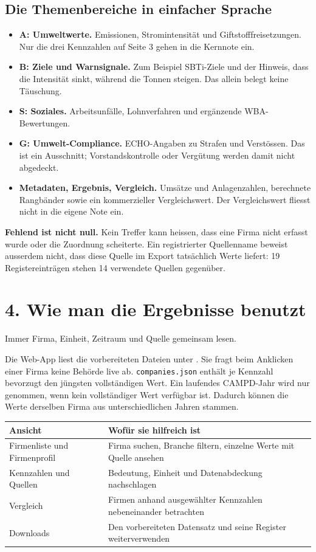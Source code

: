 \documentclass[11pt,a4paper]{article}
\newcommand{\pf}[1]{\path{#1}}
\newcommand{\lead}[1]{{\large\sffamily\color{accent}#1}\par}
\newcommand{\page}[2]{\clearpage\section*{#1}\lead{#2}}
\begin{document}
\subsection*{Die Themenbereiche in einfacher Sprache}
\begin{itemize}
\item \textbf{A: Umweltwerte.} Emissionen, Stromintensität und Giftstofffreisetzungen. Nur die drei Kennzahlen auf Seite 3 gehen in die Kernnote ein.
\item \textbf{B: Ziele und Warnsignale.} Zum Beispiel SBTi-Ziele und der Hinweis, dass die Intensität sinkt, während die Tonnen steigen. Das allein belegt keine Täuschung.
\item \textbf{S: Soziales.} Arbeitsunfälle, Lohnverfahren und ergänzende WBA-Bewertungen.
\item \textbf{G: Umwelt-Compliance.} ECHO-Angaben zu Strafen und Verstössen. Das ist ein Ausschnitt; Vorstandskontrolle oder Vergütung werden damit nicht abgedeckt.
\item \textbf{Metadaten, Ergebnis, Vergleich.} Umsätze und Anlagenzahlen, berechnete Rangbänder sowie ein kommerzieller Vergleichswert. Der Vergleichswert fliesst nicht in die eigene Note ein.
\end{itemize}

\textbf{Fehlend ist nicht null.} Kein Treffer kann heissen, dass eine Firma nicht erfasst wurde oder die Zuordnung scheiterte. Ein registrierter Quellenname beweist ausserdem nicht, dass diese Quelle im Export tatsächlich Werte liefert: 19 Registereinträgen stehen 14 verwendete Quellen gegenüber.

\page{4. Wie man die Ergebnisse benutzt}{Immer Firma, Einheit, Zeitraum und Quelle gemeinsam lesen.}
Die Web-App liest die vorbereiteten Dateien unter \pf{web/public/data/}. Sie fragt beim Anklicken einer Firma keine Behörde live ab. \texttt{companies.json} enthält je Kennzahl bevorzugt den jüngsten vollständigen Wert. Ein laufendes CAMPD-Jahr wird nur genommen, wenn kein vollständiger Wert verfügbar ist. Dadurch können die Werte derselben Firma aus unterschiedlichen Jahren stammen.

\begin{tabularx}{\linewidth}{@{}p{42mm}Y@{}}\toprule
Ansicht & Wofür sie hilfreich ist\\\midrule
Firmenliste und Firmenprofil & Firma suchen, Branche filtern, einzelne Werte mit Quelle ansehen\\
Kennzahlen und Quellen & Bedeutung, Einheit und Datenabdeckung nachschlagen\\
Vergleich & Firmen anhand ausgewählter Kennzahlen nebeneinander betrachten\\
Downloads & Den vorbereiteten Datensatz und seine Register weiterverwenden\\\bottomrule
\end{tabularx}
\end{document}
